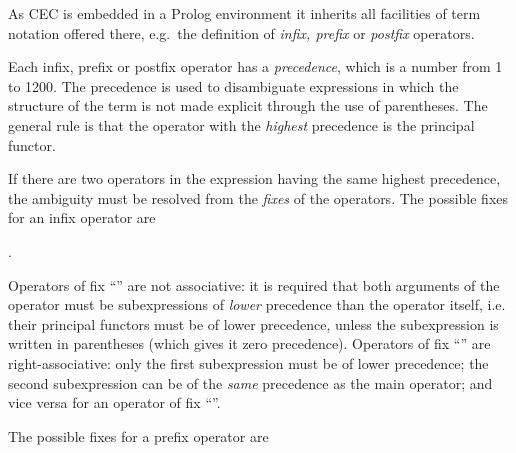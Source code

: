 {As CEC is embedded in a Prolog environment it inherits all facilities of term
notation offered there, e.g.\ the definition of {\em infix, prefix} 
or {\em  postfix} operators. 

Each infix, prefix or postfix operator has a {\em precedence}, which is a
number from 1 to 1200. The precedence is used to disambiguate expressions in
which the structure of the term is not made explicit through the use
of parentheses.  The general rule is that the operator with the {\em highest}
precedence is the principal functor. 

%
%
%
%
%
If there are two operators in the expression having the same highest 
precedence,
the ambiguity must be resolved from the {\em fixes} of the operators. 
The possible fixes for an infix operator are \bigskip

  . \bigskip

Operators of fix ``'' are not associative: it is required 
that both arguments of the operator must be subexpressions of 
{\em lower} precedence than the operator itself, i.e. their principal 
functors must be of lower precedence, unless the subexpression is
written in parentheses (which gives it zero precedence).
Operators of fix ``'' are right-associative:
only the first subexpression must be of lower precedence; the second 
subexpression can be of the {\em same} precedence as the main
operator; and vice versa for an operator of fix ``''.

%
%
%
%
%
%
%
\noindent
The possible fixes for a prefix operator are\bigskip

 \bigskip

}
